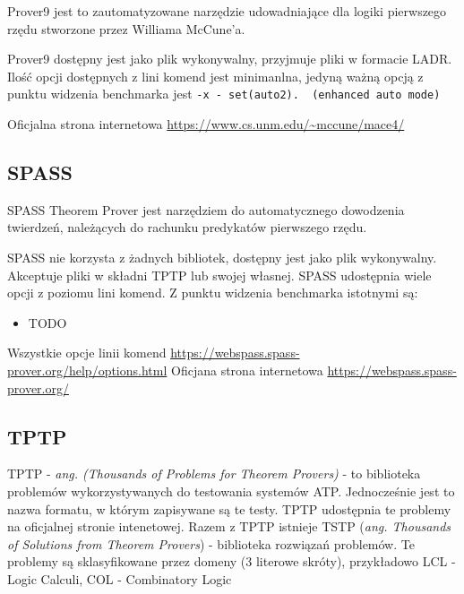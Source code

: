\documentclass[a4paper,12pt]{article}
\begin{document}
Prover9 jest to zautomatyzowane narzędzie udowadniające dla logiki pierwszego rzędu stworzone przez Williama McCune’a.

Prover9 dostępny jest jako plik wykonywalny, przyjmuje pliki w formacie \gls{LADR}. Ilość opcji dostępnych z lini komend jest minimanlna, jedyną ważną opcją z punktu widzenia benchmarka jest
\lstinline{-x - set(auto2).  (enhanced auto mode)}

Oficjalna strona internetowa \url{https://www.cs.unm.edu/~mccune/mace4/}




\subsection{SPASS}

SPASS Theorem Prover jest narzędziem do automatycznego dowodzenia twierdzeń, należących do rachunku predykatów pierwszego rzędu.

SPASS nie korzysta z żadnych bibliotek, dostępny jest jako plik wykonywalny. Akceptuje pliki w składni TPTP lub swojej własnej. SPASS udostępnia wiele opcji z poziomu lini komend. Z punktu widzenia benchmarka istotnymi są:

\begin{itemize}
  \item TODO
\end{itemize}

\noindent
Wszystkie opcje linii komend \url{https://webspass.spass-prover.org/help/options.html}
\noindent \newline
Oficjana strona internetowa \url{https://webspass.spass-prover.org/}




\subsection{TPTP}

TPTP - \textit{ang. (Thousands of Problems for Theorem Provers)} - to biblioteka problemów wykorzystywanych do testowania systemów \gls{ATP}. Jednocześnie jest to nazwa formatu, w którym zapisywane są te testy. TPTP udostępnia te problemy na oficjalnej stronie intenetowej. Razem z TPTP istnieje TSTP (\textit{ang. Thousands of Solutions from Theorem Provers}) - biblioteka rozwiązań problemów.
Te problemy są sklasyfikowane przez domeny (3 literowe skróty), przykładowo LCL - Logic Calculi, COL - Combinatory Logic
\end{document}
